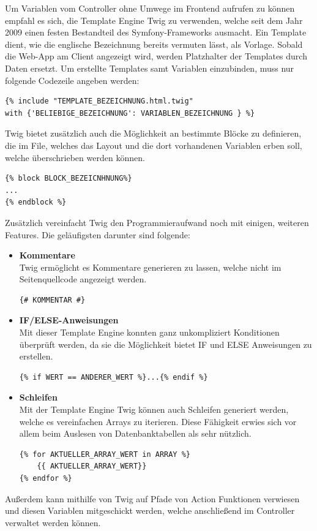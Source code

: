 Um Variablen vom Controller ohne Umwege im Frontend aufrufen zu können empfahl es sich, die Template Engine {Twig\cite{twig}} zu verwenden, welche seit dem Jahr 2009 einen festen Bestandteil des Symfony-Frameworks ausmacht. Ein Template dient, wie die englische Bezeichnung bereits vermuten lässt, als Vorlage. Sobald die Web-App am Client angezeigt wird, werden Platzhalter der Templates durch Daten ersetzt.
Um erstellte Templates samt Variablen einzubinden, muss nur folgende Codezeile angeben werden:
	\lstset{language = php}
  	\begin{lstlisting}
{% include "TEMPLATE_BEZEICHNUNG.html.twig"
with {'BELIEBIGE_BEZEICHNUNG': VARIABLEN_BEZEICHNUNG } %}
  	\end{lstlisting}
  	Twig bietet zusätzlich auch die Möglichkeit an bestimmte Blöcke zu definieren, die im File, welches das Layout und die dort vorhandenen Variablen erben soll, welche überschrieben werden können.
	\lstset{language = php}
  	\begin{lstlisting}
{% block BLOCK_BEZEICNHNUNG%}
...
{% endblock %}
	\end{lstlisting}
Zusätzlich vereinfacht Twig den Programmieraufwand noch mit einigen, weiteren Features. Die geläufigsten darunter sind folgende:
\begin{itemize}
    \item \textbf{Kommentare}\\
Twig ermöglicht es Kommentare generieren zu lassen, welche nicht im Seitenquellcode angezeigt werden.
\lstset{language = html}
  	\begin{lstlisting}
{# KOMMENTAR #}
	\end{lstlisting}
    \item \textbf{IF/ELSE-Anweisungen}\\
Mit dieser Template Engine konnten ganz unkompliziert Konditionen überprüft werden, da sie die Möglichkeit bietet IF und ELSE Anweisungen zu erstellen.
\lstset{language = php}
  	\begin{lstlisting}
{% if WERT == ANDERER_WERT %}...{% endif %}
	\end{lstlisting}
    \item \textbf{Schleifen}\\
Mit der Template Engine Twig können auch Schleifen generiert werden, welche es vereinfachen Arrays zu iterieren. Diese Fähigkeit erwies sich vor allem beim Auslesen von Datenbanktabellen als sehr nützlich.
\lstset{language = php}
  	\begin{lstlisting}
{% for AKTUELLER_ARRAY_WERT in ARRAY %}
	{{ AKTUELLER_ARRAY_WERT}}
{% endfor %}
	\end{lstlisting}
  \end{itemize}
Außerdem kann mithilfe von Twig auf Pfade von Action Funktionen verwiesen und diesen Variablen mitgeschickt werden, welche anschließend im Controller verwaltet werden können.

